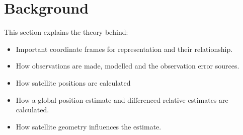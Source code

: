 \chapter{Background}
This section explains the theory behind:
\begin{itemize}
\item Important coordinate frames for representation and their relationship.
\item How observations are made, modelled and the observation error sources.
\item How satellite positions are calculated
\item How a global position estimate and differenced relative estimates are calculated.
\item How satellite geometry influences the estimate.
\end{itemize}

